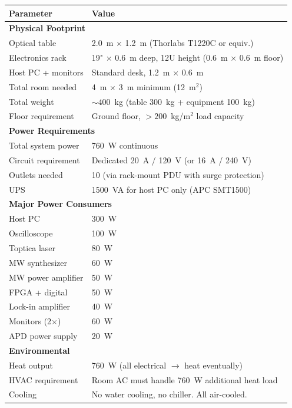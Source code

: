 \documentclass[11pt,a4paper,openany]{book}
\begin{document}
\begin{center}
\begin{tabular}{ll}
\toprule
\textbf{Parameter} & \textbf{Value} \\
\midrule
\multicolumn{2}{l}{\textbf{Physical Footprint}} \\
\midrule
Optical table & 2.0~m $\times$ 1.2~m (Thorlabs T1220C or equiv.) \\
Electronics rack & 19" $\times$ 0.6~m deep, 12U height (0.6~m $\times$ 0.6~m floor) \\
Host PC + monitors & Standard desk, 1.2~m $\times$ 0.6~m \\
Total room needed & 4~m $\times$ 3~m minimum (12~m$^2$) \\
Total weight & ${\sim}400$~kg (table 300~kg + equipment 100~kg) \\
Floor requirement & Ground floor, $> 200$~kg/m$^2$ load capacity \\
\midrule
\multicolumn{2}{l}{\textbf{Power Requirements}} \\
\midrule
Total system power & 760~W continuous \\
Circuit requirement & Dedicated 20~A / 120~V (or 16~A / 240~V) \\
Outlets needed & 10 (via rack-mount PDU with surge protection) \\
UPS & 1500~VA for host PC only (APC SMT1500) \\
\midrule
\multicolumn{2}{l}{\textbf{Major Power Consumers}} \\
\midrule
Host PC & 300~W \\
Oscilloscope & 100~W \\
Toptica laser & 80~W \\
MW synthesizer & 60~W \\
MW power amplifier & 50~W \\
FPGA + digital & 50~W \\
Lock-in amplifier & 40~W \\
Monitors (2$\times$) & 60~W \\
APD power supply & 20~W \\
\midrule
\multicolumn{2}{l}{\textbf{Environmental}} \\
\midrule
Heat output & 760~W (all electrical $\to$ heat eventually) \\
HVAC requirement & Room AC must handle 760~W additional heat load \\
Cooling & No water cooling, no chiller. All air-cooled. \\
\bottomrule
\end{tabular}
\end{center}
\end{document}

